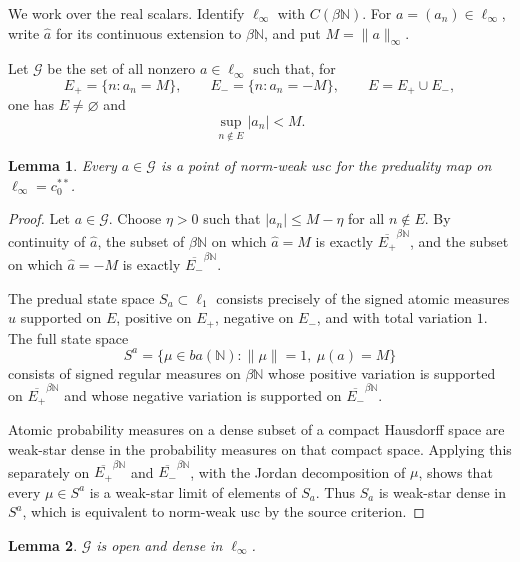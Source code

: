 \documentclass[11pt]{article}
\newtheorem{lemma}{Lemma}
\begin{document}
We work over the real scalars. Identify \(\ell_\infty\) with \(C(\beta\mathbb
N)\). For \(a=(a_n)\in\ell_\infty\), write \(\widehat a\) for its continuous
extension to \(\beta\mathbb N\), and put \(M=\|a\|_\infty\).

Let \(\mathcal G\) be the set of all nonzero \(a\in\ell_\infty\) such that,
for
\[
E_+=\{n:a_n=M\},\qquad E_-=\{n:a_n=-M\},\qquad E=E_+\cup E_-,
\]
one has \(E\ne\varnothing\) and
\[
  \sup_{n\notin E}|a_n|<M.
\]

\begin{lemma}
Every \(a\in\mathcal G\) is a point of norm-weak usc for the preduality map on
\(\ell_\infty=c_0^{**}\).
\end{lemma}

\begin{proof}
Let \(a\in\mathcal G\). Choose \(\eta>0\) such that \(|a_n|\le M-\eta\) for
all \(n\notin E\). By continuity of \(\widehat a\), the subset of
\(\beta\mathbb N\) on which \(\widehat a=M\) is exactly \(\overline{E_+}^{\beta
\mathbb N}\), and the subset on which \(\widehat a=-M\) is exactly
\(\overline{E_-}^{\beta\mathbb N}\).

The predual state space \(S_a\subset \ell_1\) consists precisely of the signed
atomic measures \(u\) supported on \(E\), positive on \(E_+\), negative on
\(E_-\), and with total variation \(1\). The full state space
\[
S^a=\{\mu\in ba(\mathbb N):\|\mu\|=1,\ \mu(a)=M\}
\]
consists of signed regular measures on \(\beta\mathbb N\) whose positive
variation is supported on \(\overline{E_+}^{\beta\mathbb N}\) and whose negative
variation is supported on \(\overline{E_-}^{\beta\mathbb N}\).

Atomic probability measures on a dense subset of a compact Hausdorff space are
weak-star dense in the probability measures on that compact space. Applying
this separately on \(\overline{E_+}^{\beta\mathbb N}\) and
\(\overline{E_-}^{\beta\mathbb N}\), with the Jordan decomposition of \(\mu\),
shows that every \(\mu\in S^a\) is a weak-star limit of elements of \(S_a\).
Thus \(S_a\) is weak-star dense in \(S^a\), which is equivalent to norm-weak
usc by the source criterion.
\end{proof}

\begin{lemma}
\(\mathcal G\) is open and dense in \(\ell_\infty\).
\end{lemma}
\end{document}
